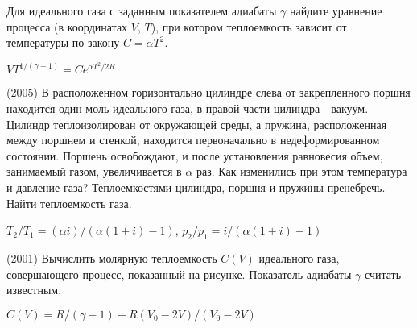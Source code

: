 \begin{ex}
Для идеального газа с заданным показателем адиабаты $\gamma$ найдите уравнение процесса (в координатах $V$, $T$), при котором теплоемкость зависит от температуры по закону $C=\alpha T^2$.
\begin{ans}
$ V T^{1/(\gamma - 1)} = C e^{\alpha T^2 / 2R}$
\end{ans}
\end{ex}

\begin{ex}
(2005) В расположенном горизонтально цилиндре слева от закрепленного поршня находится один моль идеального газа, в правой части цилиндра - вакуум. Цилиндр теплоизолирован от окружающей среды, а пружина, расположенная между поршнем и стенкой, находится первоначально в недеформированном состоянии. Поршень освобождают, и после установления равновесия объем, занимаемый газом, увеличивается в $\alpha$ раз. Как изменились при этом температура и давление газа? Теплоемкостями цилиндра, поршня и пружины пренебречь. Найти теплоемкость газа.
\begin{center}

\end{center}
\begin{ans}
$T_2/T_1 = (\alpha i)/(\alpha (1+i) - 1)$, $p_2/p_1 = i/(\alpha (1+i) - 1)$
\end{ans}
\end{ex}

\begin{samepage}
\begin{ex}
(2001) Вычислить молярную теплоемкость $C(V)$ идеального газа, совершающего процесс, показанный на рисунке. Показатель адиабаты $\gamma$ считать известным.
\begin{center}

\end{center}
\begin{ans}
$C(V) = R/(\gamma-1)+R(V_0-2V)/(V_0-2V)$
\end{ans}
\end{ex}
\end{samepage}